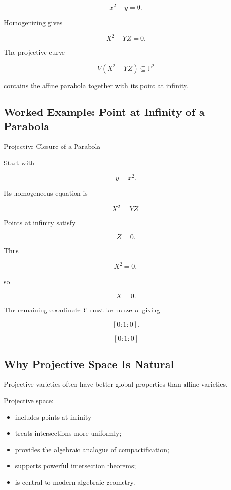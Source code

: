 \[
x^2-y=0.
\]

Homogenizing gives

\[
\boxed{
X^2-YZ=0.
}
\]

The projective curve

\[
V(X^2-YZ)
\subseteq\mathbb{P}^2
\]

contains the affine parabola together with its point at infinity.

\subsection{Worked Example: Point at Infinity of a Parabola}
\label{subsec:worked-parabola-infinity}

\begin{workedexamplebox}{Projective Closure of a Parabola}

Start with

\[
y=x^2.
\]

Its homogeneous equation is

\[
X^2=YZ.
\]

Points at infinity satisfy

\[
Z=0.
\]

Thus

\[
X^2=0,
\]

so

\[
X=0.
\]

The remaining coordinate \(Y\) must be nonzero, giving

\[
[0:1:0].
\]

\begin{answerbox}
\[
\boxed{
[0:1:0]
}
\]
\end{answerbox}
\end{workedexamplebox}

\subsection{Why Projective Space Is Natural}
\label{subsec:why-projective-natural}

Projective varieties often have better global properties than affine
varieties.

Projective space:

\begin{itemize}
    \item includes points at infinity;
    \item treats intersections more uniformly;
    \item provides the algebraic analogue of compactification;
    \item supports powerful intersection theorems;
    \item is central to modern algebraic geometry.
\end{itemize}

